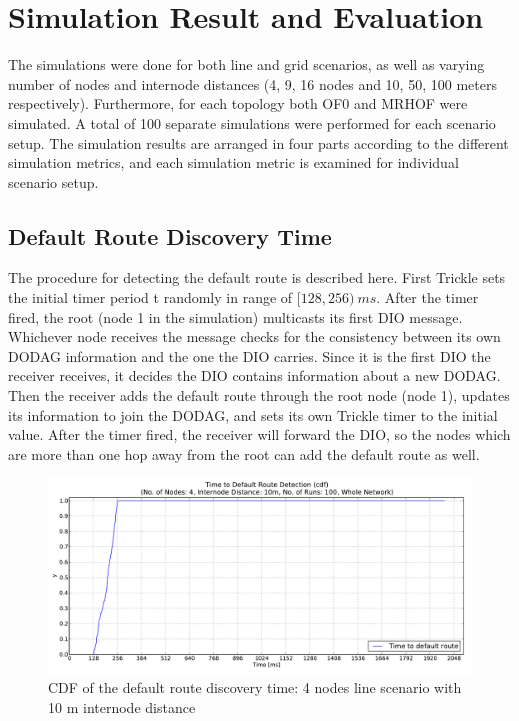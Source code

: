 \chapter{Simulation Result and Evaluation}
\label{ResultandEvaluation}

The simulations were done for both line and grid scenarios, as well as varying number of nodes and internode distances (4, 9, 16 nodes and 10, 50, 100 meters respectively). Furthermore, for each topology both OF0 and MRHOF were simulated. A total of 100 separate simulations were performed for each scenario setup. The simulation results are arranged in four parts according to the different simulation metrics, and each simulation metric is examined for individual scenario setup. 

\section{Default Route Discovery Time}
\label{default route}

The procedure for detecting the default route is described here. First Trickle sets the initial timer period t randomly in range of $[128,256)\:ms$\@. After the timer fired, the root (node 1 in the simulation) multicasts its first DIO message. Whichever node receives the message checks for the consistency between its own DODAG information and the one the DIO carries. Since it is the first DIO the receiver receives, it decides the DIO contains information about a new DODAG. Then the receiver adds the default route through the root node (node 1)\@, updates its information to join the DODAG, and sets its own Trickle timer to the initial value. After the timer fired, the receiver will forward the DIO, so the nodes which are more than one hop away from the root can add the default route as well.
\begin{figure}[htbp]
  \begin{center}
    \leavevmode
      \includegraphics[scale=0.38]
      {Pics/results/4/MRHOF/line/dist10_montecarlo_cdf_hist.pdf}
   \caption{CDF of the default route discovery time: 4 nodes line scenario with 10 m internode distance}
    \label{fig:dist10_montecarlo_cdf_hist}
  \end{center}
\end{figure}

